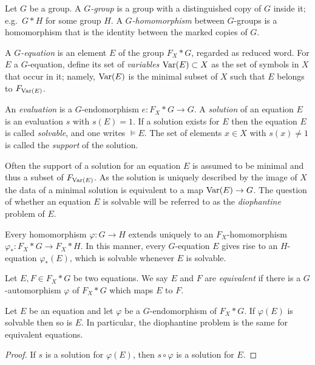 \documentclass[a4paper,11pt]{amsart}
\begin{document}
\begin{defi}
  Let $G$ be a group. A \emph{$G$-group} is a group with a
  distinguished copy of $G$ inside it; e.g.\ $G*H$ for some group
  $H$. A \emph{$G$-homomorphism} between $G$-groups is a homomorphism
  that is the identity between the marked copies of $G$.

  A \emph{$G$-equation} is an element $E$ of the group $F_X * G$,
  regarded as reduced word. For $E$ a $G$-equation, define its set of
  \emph{variables} $\textup{Var}(E)\subset X$ as the set of symbols in $X$
  that occur in it; namely, $\textup{Var}(E)$ is the minimal subset of $X$
  such that $E$ belongs to $F_{\textup{Var}(E)}$.

  An \emph{evaluation} is a $G$-endomorphism $e\colon F_X * G \to G$.
  A \emph{solution} of an equation $E$ is an evaluation $s$ with
  $s(E)=1$. If a solution exists for $E$ then the equation $E$ is
  called \emph{solvable}, and one writes $\models E$.  The set of
  elements $x\in X$ with $s(x)\neq 1$ is called the \emph{support} of
  the solution.
\end{defi}

Often the support of a solution for an equation $E$ is assumed to be
minimal and thus a subset of $F_{\textup{Var}(E)}$.  As the solution is
uniquely described by the image of $X$ the data of a minimal solution
is equivalent to a map $\textup{Var}(E) \to G$.  The question of whether an
equation $E$ is solvable will be referred to as the \emph{diophantine}
problem of $E$.

Every homomorphism $\varphi \colon G \to H$ extends uniquely to an
$F_X$-ho\-mo\-morphism $\varphi_* \colon F_X*G \to F_X*H$. In this manner,
every $G$-equation $E$ gives rise to an $H$-equation $\varphi_*(E)$,
which is solvable whenever $E$ is solvable.

\begin{defi}
  Let $E,F\in F_X* G$ be two equations. We say $E$ and $F$ are
  \emph{equivalent} if there is a $G$-automorphism $\varphi$ of
  $F_X*G$ which maps $E$ to $F$.
\end{defi}
\begin{lem}
  Let $E$ be an equation and let $\varphi$ be a $G$-endomorphism of
  $F_X*G$. If $\varphi(E)$ is solvable then so is $E$. In particular,
  the diophantine problem is the same for equivalent equations.
\end{lem}
\begin{proof}
  If $s$ is a solution for $\varphi(E)$, then $s\circ\varphi$ is a
  solution for $E$.
\end{proof}
\end{document}
